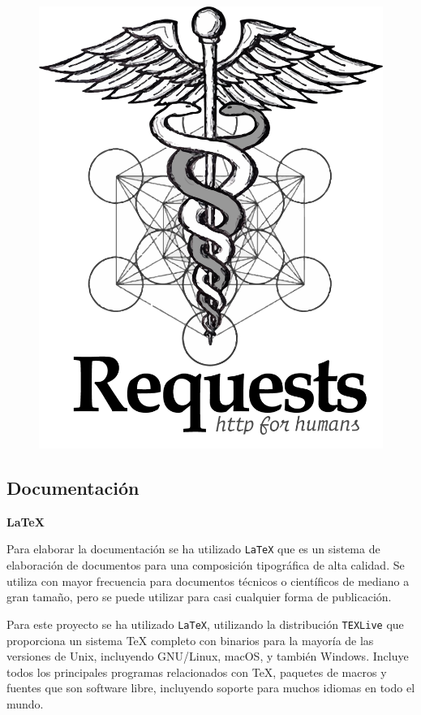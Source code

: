 \begin{figure}[h]
	\centering
	\includegraphics[scale=0.08]{images/20}
\end{figure}

\vspace{-0.5cm}

\subsection{Documentación}

\textbf{LaTeX}

Para elaborar la documentación se ha utilizado \texttt{LaTeX} \cite{ref19} que es un sistema de elaboración de documentos para una composición tipográfica de alta calidad. Se utiliza con mayor frecuencia para documentos técnicos o científicos de mediano a gran tamaño, pero se puede utilizar para casi cualquier forma de publicación.

Para este proyecto se ha utilizado \texttt{LaTeX}, utilizando la distribución \texttt{TEXLive} \cite{ref20} que proporciona un sistema TeX completo con binarios para la mayoría de las versiones de Unix, incluyendo GNU/Linux, macOS, y también Windows. Incluye todos los principales programas relacionados con TeX, paquetes de macros y fuentes que son software libre, incluyendo soporte para muchos idiomas en todo el mundo. 

